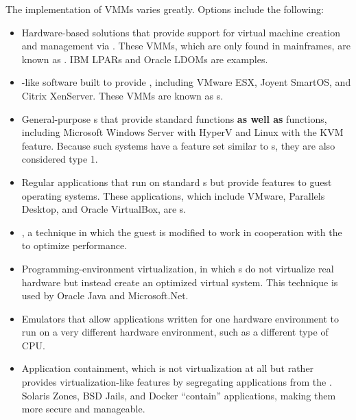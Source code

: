 The implementation of VMMs varies greatly. Options include the following:
\begin{itemize}[noitemsep]
\item Hardware-based solutions that provide support for virtual machine creation and management via .
  These VMMs, which are only found in mainframes, are known as .
  IBM LPARs and Oracle LDOMs are examples.
\item {}-like software built to provide , including VMware ESX, Joyent SmartOS, and Citrix XenServer.
  These VMMs are known as s.
\item General-purpose s that provide standard functions \textbf{as well as}  functions, including Microsoft Windows Server with HyperV and Linux with the KVM feature.
  Because such systems have a feature set similar to s, they are also considered type 1.
\item Regular applications that run on standard s but provide  features to guest operating systems.
  These applications, which include VMware, Parallels Desktop, and Oracle VirtualBox, are s.
\item {}, a technique in which the guest  is modified to work in cooperation with the  to optimize performance.
\item Programming-environment virtualization, in which s do not virtualize real hardware but instead create an optimized virtual system.
  This technique is used by Oracle Java and Microsoft.Net.
\item Emulators that allow applications written for one hardware environment to run on a very different hardware environment, such as a different type of CPU.\@
\item Application containment, which is not virtualization at all but rather provides virtualization-like features by segregating applications from the .
  Solaris Zones, BSD Jails, and Docker ``contain'' applications, making them more secure and manageable.
\end{itemize}


